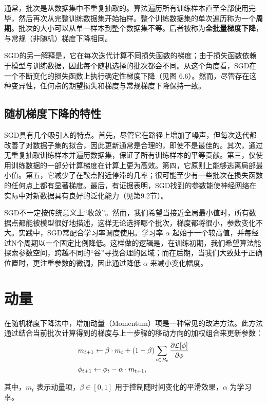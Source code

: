 通常，批次是从数据集中不重复抽取的。算法遍历所有训练样本直至全部使用完毕，然后再次从完整训练数据集开始抽样。整个训练数据集的单次遍历称为一个\textbf{周期}。批次的大小可以从单一样本到整个数据集不等。后者被称为\textbf{全批量梯度下降}，与常规（非随机）梯度下降相同。

SGD的另一解释是，它在每次迭代计算不同损失函数的梯度；由于损失函数依赖于模型与训练数据，因此每个随机选择的批次都会不同。从这个角度看，SGD在一个不断变化的损失函数上执行确定性梯度下降（见图 6.6）。然而，尽管存在这种变异性，任何点的期望损失和梯度与常规梯度下降保持一致。


\subsection{随机梯度下降的特性}
SGD具有几个吸引人的特点。首先，尽管它在路径上增加了噪声，但每次迭代都改善了对数据子集的拟合，因此更新通常是合理的，即使不是最佳的。其次，通过无重复抽取训练样本并遍历数据集，保证了所有训练样本的平等贡献。第三，仅使用训练数据的一部分计算梯度在计算上更为高效。第四，它原则上能够逃离局部最小值。第五，它减少了在鞍点附近停滞的几率；很可能至少有一些批次在损失函数的任何点上都有显著梯度。最后，有证据表明，SGD找到的参数能使神经网络在实际中对新数据具有良好的泛化能力（见第9.2节）。

SGD不一定按传统意义上“收敛”。然而，我们希望当接近全局最小值时，所有数据点都能被模型很好地描述，这样无论选择哪个批次，梯度都将很小，参数变化不大。实践中，SGD常配合学习率调度使用。学习率 \(\alpha\) 起始于一个较高值，并每经过N个周期以一个固定比例降低。这样做的逻辑是，在训练初期，我们希望算法能探索参数空间，跨越不同的“谷”寻找合理的区域；而在后期，当我们大致处于正确位置时，更注重参数的微调，因此通过降低 \(\alpha\) 来减小变化幅度。

\section{动量}
在随机梯度下降法中，增加动量（Momentum）项是一种常见的改进方法。此方法通过结合当前批次计算得到的梯度与上一步骤的移动方向的加权组合来更新参数：
\begin{align}
& m_{t+1} \leftarrow \beta \cdot m_t + (1 - \beta) \sum_{i \in B_t} \frac{\partial \mathcal{L}[\phi]}{\partial \phi} \notag \\
& \phi_{t+1} \leftarrow \phi_t - \alpha \cdot m_{t+1},
\end{align}

其中，\(m_t\) 表示动量项，\(\beta \in [0,1]\) 用于控制随时间变化的平滑效果，\(\alpha\) 为学习率。

